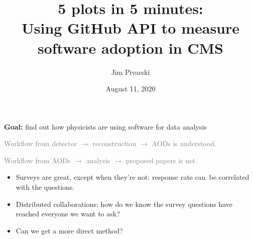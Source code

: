 \documentclass[aspectratio=169]{beamer}
\title[2020-08-11-snowmass-github]{{\LARGE 5 plots in 5 minutes:} \\ Using GitHub API to measure software adoption in CMS}
\author{Jim Pivarski}
\institute{Princeton University -- IRIS-HEP}
\date{August 11, 2020}
\begin{document}

\begin{frame}
  \titlepage
\end{frame}




\begin{frame}{{\bf Goal:} find out how physicists are using software for data analysis}
\Large

\vspace{0.5 cm}
\textcolor{gray}{Workflow from detector $\to$ reconstruction $\to$ AODs is understood.}

\vspace{0.5 cm}
\textcolor{gray}{Workflow from AODs $\to$ analysis $\to$ proposed papers is not.}

\vspace{0.5 cm}
\begin{itemize}\setlength{\itemsep}{0.25 cm}
\item Surveys are great, except when they're not: response rate \mbox{can be} correlated with the questions.
\item Distributed collaborations: how do we know the survey questions have reached everyone we want to ask?
\item Can we get a more direct method?
\end{itemize}
\end{frame}
\end{document}
